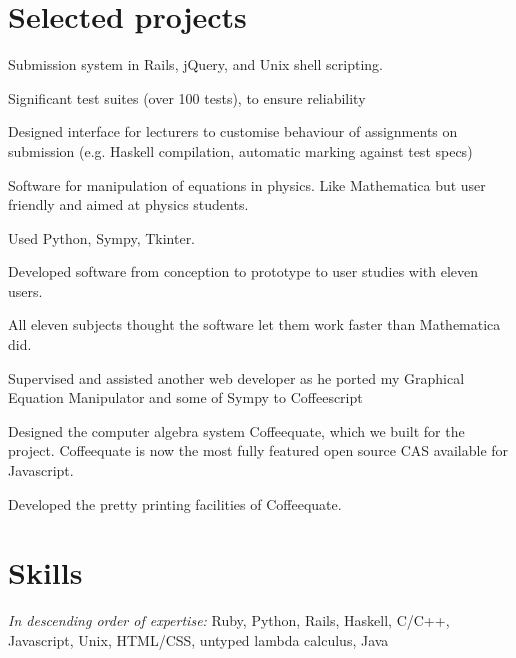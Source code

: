 \documentclass[letterpaper]{resume}
\begin{document}
\section{Selected projects}

\begin{compactitem}
\item Submission system in Rails, jQuery, and Unix shell scripting.
\item Significant test suites (over 100 tests), to ensure reliability
\item Designed interface for lecturers to customise behaviour of assignments on submission (e.g. Haskell compilation, automatic marking against test specs)
\end{compactitem}

\begin{compactitem}
\item Software for manipulation of equations in physics. Like Mathematica but user friendly and aimed at physics students.
\item Used Python, Sympy, Tkinter.
\item Developed software from conception to prototype to user studies with eleven users.
\item All eleven subjects thought the software let them work faster than Mathematica did.
\end{compactitem}

\begin{compactitem}
\item Supervised and assisted another web developer as he ported my Graphical Equation Manipulator and some of Sympy to Coffeescript
\item Designed the computer algebra system Coffeequate, which we built for the project. Coffeequate is now the most fully featured open source CAS available for Javascript.
\item Developed the pretty printing facilities of Coffeequate.
\end{compactitem}

\section{Skills}

\textit{In descending order of expertise:} Ruby, Python, Rails, Haskell, C/C++, Javascript, Unix, HTML/CSS, untyped lambda calculus, Java
\end{document}

